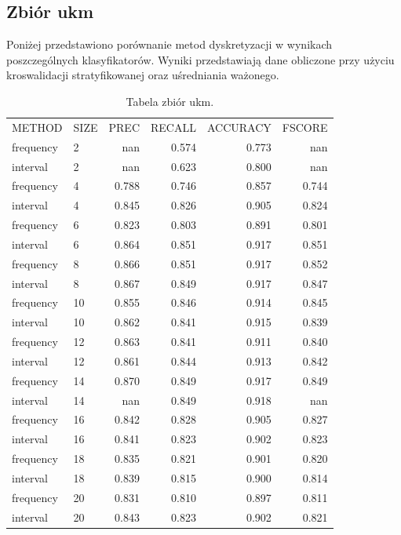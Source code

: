 \subsection{Zbiór ukm}
Poniżej przedstawiono porównanie metod dyskretyzacji w wynikach poszczególnych klasyfikatorów. Wyniki przedstawiają dane obliczone przy użyciu kroswalidacji stratyfikowanej oraz uśredniania ważonego.

\begin{table}[H]
\centering
\caption{Tabela zbiór ukm.}
\label{table-ukm}
\begin{tabular}{llrrrr}
METHOD    & SIZE & PREC  & RECALL & ACCURACY & FSCORE \\
frequency & 2    & nan   & 0.574  & 0.773    & nan    \\
interval  & 2    & nan   & 0.623  & 0.800    & nan    \\
frequency & 4    & 0.788 & 0.746  & 0.857    & 0.744  \\
interval  & 4    & 0.845 & 0.826  & 0.905    & 0.824  \\
frequency & 6    & 0.823 & 0.803  & 0.891    & 0.801  \\
interval  & 6    & 0.864 & 0.851  & 0.917    & 0.851  \\
frequency & 8    & 0.866 & 0.851  & 0.917    & 0.852  \\
interval  & 8    & 0.867 & 0.849  & 0.917    & 0.847  \\
frequency & 10   & 0.855 & 0.846  & 0.914    & 0.845  \\
interval  & 10   & 0.862 & 0.841  & 0.915    & 0.839  \\
frequency & 12   & 0.863 & 0.841  & 0.911    & 0.840  \\
interval  & 12   & 0.861 & 0.844  & 0.913    & 0.842  \\
frequency & 14   & 0.870 & 0.849  & 0.917    & 0.849  \\
interval  & 14   & nan   & 0.849  & 0.918    & nan    \\
frequency & 16   & 0.842 & 0.828  & 0.905    & 0.827  \\
interval  & 16   & 0.841 & 0.823  & 0.902    & 0.823  \\
frequency & 18   & 0.835 & 0.821  & 0.901    & 0.820  \\
interval  & 18   & 0.839 & 0.815  & 0.900    & 0.814  \\
frequency & 20   & 0.831 & 0.810  & 0.897    & 0.811  \\
interval  & 20   & 0.843 & 0.823  & 0.902    & 0.821 
\end{tabular}
\end{table}
